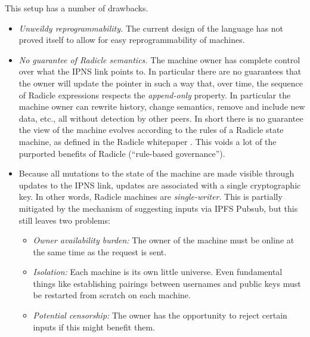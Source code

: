 \documentclass[a4paper, oneside, 10pt]{amsart}
\begin{document}
This setup has a number of drawbacks.
\begin{itemize}
  \item \emph{Unweildy reprogrammability.} The current design of the language
    has not proved itself to allow for easy reprogrammability of machines.
  \item \emph{No guarantee of Radicle semantics.} The machine owner has complete
    control over what the IPNS link points to. In particular there are no
    guarantees that the owner will update the pointer in such a way that, over
    time, the sequence of Radicle expressions respects the \emph{append-only}
    property. In particular the machine owner can rewrite history, change
    semantics, remove and include new data, etc., all without detection by other
    peers. In short there is no guarantee the view of the machine evolves
    according to the rules of a Radicle state machine, as defined in the Radicle
    whitepaper \cite{radicle}. This voids a lot of the purported benefits of
    Radicle (``rule-based governance'').
  \item Because all mutations to the state of the machine are made visible
    through updates to the IPNS link, updates are associated with a single
    cryptographic key. In other words, Radicle machines are
    \emph{single-writer}. This is partially mitigated by the mechanism of
    suggesting inputs via IPFS Pubsub, but this still leaves two problems:
    \begin{itemize}
    \item \emph{Owner availability burden:} The owner of the machine must be
      online at the same time as the request is sent.
    \item \emph{Isolation:} Each machine is its own little universe. Even
      fundamental things like establishing pairings between usernames and public
      keys must be restarted from scratch on each machine.
    \item \emph{Potential censorship:} The owner has the opportunity to reject
      certain inputs if this might benefit them.
    \end{itemize}
\end{itemize}
\end{document}
